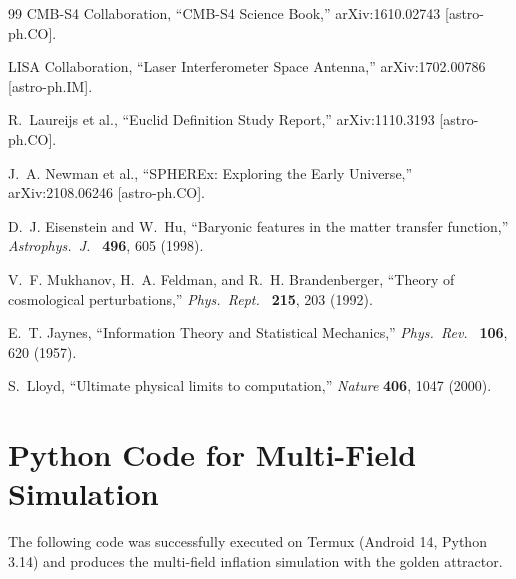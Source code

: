 \documentclass[11pt,a4paper]{article}
\theoremstyle{definition}
\begin{document}
\begin{thebibliography}{99}
CMB-S4 Collaboration, ``CMB-S4 Science Book,'' arXiv:1610.02743 [astro-ph.CO].

LISA Collaboration, ``Laser Interferometer Space Antenna,'' arXiv:1702.00786 [astro-ph.IM].

R.~Laureijs et al., ``Euclid Definition Study Report,'' arXiv:1110.3193 [astro-ph.CO].

J.~A. Newman et al., ``SPHEREx: Exploring the Early Universe,'' arXiv:2108.06246 [astro-ph.CO].

D.~J. Eisenstein and W.~Hu, ``Baryonic features in the matter transfer function,'' \textit{Astrophys.\ J.\ } \textbf{496}, 605 (1998).

V.~F. Mukhanov, H.~A. Feldman, and R.~H. Brandenberger, ``Theory of cosmological perturbations,'' \textit{Phys.\ Rept.\ } \textbf{215}, 203 (1992).

E.~T. Jaynes, ``Information Theory and Statistical Mechanics,'' \textit{Phys.\ Rev.\ } \textbf{106}, 620 (1957).

S.~Lloyd, ``Ultimate physical limits to computation,'' \textit{Nature} \textbf{406}, 1047 (2000).

\end{thebibliography}

\newpage
\appendix
\section{Python Code for Multi-Field Simulation}\label{app:code}

The following code was successfully executed on Termux (Android 14, Python 3.14) and produces the multi-field inflation simulation with the golden attractor.
\end{document}
